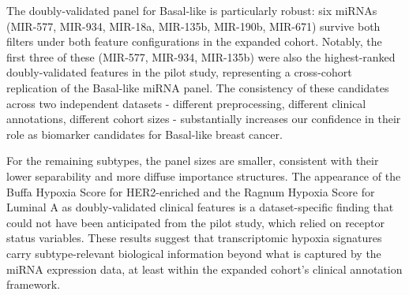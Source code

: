 
The doubly-validated panel for Basal-like is particularly robust: six miRNAs
(MIR-577, MIR-934, MIR-18a, MIR-135b, MIR-190b, MIR-671) survive both filters
under both feature configurations in the expanded cohort. Notably, the first three
of these (MIR-577, MIR-934, MIR-135b) were also the highest-ranked doubly-validated
features in the pilot study, representing a cross-cohort replication of the
Basal-like miRNA panel. The consistency of these candidates across two independent
datasets - different preprocessing, different clinical annotations, different cohort
sizes - substantially increases our confidence in their role as biomarker candidates
for Basal-like breast cancer.

For the remaining subtypes, the panel sizes are smaller, consistent with their lower
separability and more diffuse importance structures. The appearance of the Buffa
Hypoxia Score for HER2-enriched and the Ragnum Hypoxia Score for Luminal A as
doubly-validated clinical features is a dataset-specific finding that could not have
been anticipated from the pilot study, which relied on receptor status variables.
These results suggest that transcriptomic hypoxia signatures carry subtype-relevant
biological information beyond what is captured by the miRNA expression data, at
least within the expanded cohort's clinical annotation framework.

